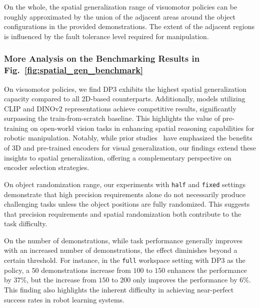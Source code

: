\begin{appendix}
On the whole, the spatial generalization range of visuomotor policies can be roughly approximated by the union of the adjacent areas around the object configurations in the provided demonstrations. The extent of the adjacent regions is influenced by the fault tolerance level required for manipulation.

\vspace{0.2cm}\subsubsection{More Analysis on the Benchmarking Results in Fig.~\ref{fig:spatial_gen_benchmark}} 
\label{sec:appendix-empirical-benchmark}
On visuomotor policies, we find DP3 exhibits the highest spatial generalization capacity compared to all 2D-based counterparts. Additionally, models utilizing CLIP and DINOv2 representations achieve competitive results, significantly surpassing the train-from-scratch baseline. This highlights the value of pre-training on open-world vision tasks in enhancing spatial reasoning capabilities for robotic manipulation. Notably, while prior studies~\cite{chi2024universal,lin2024data,burns2023makes,zhu2024point} have emphasized the benefits of 3D and pre-trained encoders for visual generalization, our findings extend these insights to spatial generalization, offering a complementary perspective on encoder selection strategies.

On object randomization range, our experiments with \texttt{half} and \texttt{fixed} settings demonstrate that high precision requirements alone do not necessarily produce challenging tasks unless the object positions are fully randomized. This suggests that precision requirements and spatial randomization both contribute to the task difficulty.

On the number of demonstrations, while task performance generally improves with an increased number of demonstrations, the effect diminishes beyond a certain threshold. For instance, in the \texttt{full} workspace setting with DP3 as the policy, a $50$ demonstrations increase from $100$ to $150$ enhances the performance by $37\%$, but the increase from $150$ to $200$ only improves the performance by $6\%$.
This finding also highlights the inherent difficulty in achieving near-perfect success rates in robot learning systems.



\end{appendix}
